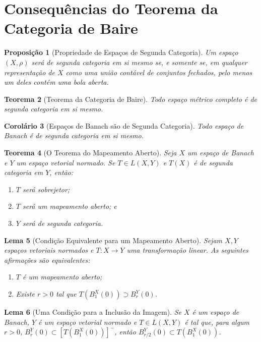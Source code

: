 \documentclass[12pt]{article}
\newtheorem{theorem}{Teorema}[section]
\newtheorem{proposition}[theorem]{Proposição}
\newtheorem{lemma}[theorem]{Lema}
\newtheorem{corollary}[theorem]{Corolário}
\begin{document}
\section{Consequências do Teorema da Categoria de Baire}
\begin{multicols}{3}
\begin{proposition}[Propriedade de Espaços de Segunda Categoria]
Um espaço $(X, \rho)$ será de segunda categoria em si mesmo se, e somente se, em qualquer representação de $X$ como uma união contável de conjuntos fechados, pelo menos um deles contém uma bola aberta.
\end{proposition}

\begin{theorem}[Teorema da Categoria de Baire]
Todo espaço métrico completo é de segunda categoria em si mesmo.
\end{theorem}

\begin{corollary}[Espaços de Banach são de Segunda Categoria]
Todo espaço de Banach é de segunda categoria em si mesmo.
\end{corollary}

\begin{theorem}[O Teorema do Mapeamento Aberto]
Seja $X$ um espaço de Banach e $Y$ um espaço vetorial normado. Se $T \in L(X, Y)$ e $T(X)$ é de segunda categoria em $Y$, então:
\begin{enumerate}[label=(\alph*)]
    \item $T$ será sobrejetor;
    \item $T$ será um mapeamento aberto; e
    \item $Y$ será de segunda categoria.
\end{enumerate}
\end{theorem}

\begin{lemma}[Condição Equivalente para um Mapeamento Aberto]
Sejam $X, Y$ espaços vetoriais normados e $T: X \to Y$ uma transformação linear. As seguintes afirmações são equivalentes:
\begin{enumerate}[label=(\alph*)]
    \item $T$ é um mapeamento aberto;
    \item Existe $r > 0$ tal que $T(B_1^X(0)) \supset B_r^Y(0)$.
\end{enumerate}
\end{lemma}

\begin{lemma}[Uma Condição para a Inclusão da Imagem]
Se $X$ é um espaço de Banach, $Y$ é um espaço vetorial normado e $T \in L(X, Y)$ é tal que, para algum $r > 0$, $B_r^Y(0) \subset [T(B_1^X(0))]^-$, então $B_{r/2}^Y(0) \subset T(B_1^X(0))$.
\end{lemma}


\end{multicols}
\end{document}
